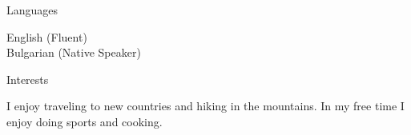 \documentclass{resume} %
\begin{document}


\begin{rSection}{Languages}

English (Fluent) \\
Bulgarian (Native Speaker)

\end{rSection}



\begin{rSection}{Interests}

I enjoy traveling to new countries and hiking in the mountains. In my free time I enjoy
doing sports and cooking.

\end{rSection}

\end{document}
